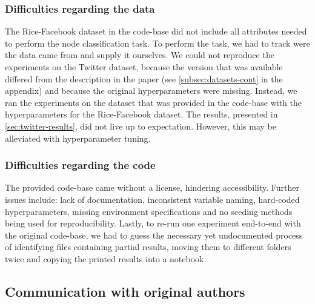 \subsubsection*{Difficulties regarding the data}
The Rice-Facebook dataset in the code-base did not include all attributes needed to perform the node classification task. To perform the task, we had to track were the data came from and supply it ourselves. 
We could not reproduce the experiments on the Twitter dataset, because the version that was available differed from the description in the paper (see \autoref{subsec:datasets-cont} in the appendix) and because the original hyperparameters were missing.
Instead, we ran the experiments on the dataset that was provided in the code-base with the hyperparameters for the Rice-Facebook dataset. The results, presented in \autoref{sec:twitter-results}, did not live up to expectation. However, this may be alleviated with hyperparameter tuning.

\subsubsection*{Difficulties regarding the code}
The provided code-base came without a license, hindering accessibility. 
Further issues include: lack of documentation, inconsistent variable naming, hard-coded hyperparameters, missing environment specifications and no seeding methods being used for reproducibility. Lastly, to re-run one experiment end-to-end with the original code-base, we had to guess the necessary yet undocumented process of identifying files containing partial results, moving them to different folders twice and copying the printed results into a notebook.

\subsection{Communication with original authors}


